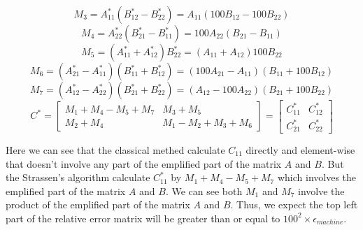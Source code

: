 \documentclass{article}
\begin{document}
\begin{equation}
    M_3 = A^{*}_{11}(B^{*}_{12} - B^{*}_{22}) = 
    A_{11}(100B_{12} - 100B_{22})
\end{equation}
\begin{equation}
    M_4 = A^{*}_{22}(B^{*}_{21} - B^{*}_{11}) = 
    100A_{22}(B_{21} - B_{11})
\end{equation}
\begin{equation}
    M_5 = (A^{*}_{11} + A^{*}_{12})B^{*}_{22} = 
    (A_{11} + A_{12})100B_{22}
\end{equation}
\begin{equation}
    M_6 = (A^{*}_{21} - A^{*}_{11})(B^{*}_{11} + B^{*}_{12}) = 
    (100A_{21} - A_{11})(B_{11} + 100B_{12})
\end{equation}
\begin{equation}
    M_7 = (A^{*}_{12} - A^{*}_{22})(B^{*}_{21} + B^{*}_{22}) = 
    (A_{12} - 100A_{22})(B_{21} + 100B_{22})
\end{equation}
\begin{equation}
    C^{*} = \begin{bmatrix}
        M_1 + M_4 - M_5 + M_7 & M_3 + M_5\\
        M_2 + M_4 & M_1 - M_2 + M_3 + M_6
    \end{bmatrix}
    = \begin{bmatrix}
        C^{*}_{11} & C^{*}_{12}\\
        C^{*}_{21} & C^{*}_{22}
    \end{bmatrix}
\end{equation}

Here we can see that the classical methed calculate $C_{11}$ directly and element-wise that
doesn't involve any part of the emplified part of the matrix $A$ and $B$. But the Strassen's algorithm
calculate $C^{*}_{11}$ by $M_1 + M_4 - M_5 + M_7$ which involves the emplified part of the matrix $A$ and $B$.
We can see both $M_1$ and $M_7$ involve the product of the emplified part of the matrix $A$ and $B$. Thus, we 
expect the top left part of the relative error matrix will be greater than or equal to $100^2 \times \epsilon_{machine}$.\\
\end{document}
